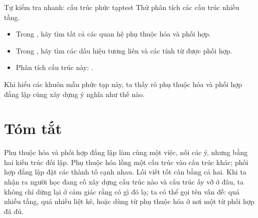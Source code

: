 \begin{tblsframedsymbol}{Tự kiểm tra nhanh: cấu trúc phức tạp}{test}
Thử phân tích các cấu trúc nhiều tầng.
\begin{itemize}[noitemsep, leftmargin=*]
    \item Trong , hãy tìm tất cả các quan hệ phụ thuộc hóa và phối hợp.
    \item Trong , hãy tìm các dấu hiệu tương liên và các tính từ được phối hợp.
    \item Phân tích cấu trúc này: .
\end{itemize}
Khi hiểu các khuôn mẫu phức tạp này, ta thấy rõ phụ thuộc hóa và phối hợp đẳng lập cùng xây dựng ý nghĩa như thế nào.
\end{tblsframedsymbol}

\section{Tóm tắt}

Phụ thuộc hóa và phối hợp đẳng lập làm cùng một việc, nối các ý, nhưng bằng hai kiến trúc đối lập. Phụ thuộc hóa lồng một cấu trúc vào cấu trúc khác; phối hợp đẳng lập đặt các thành tố cạnh nhau. Lối viết tốt cân bằng cả hai. Khi ta nhận ra người học đang cố xây dựng cấu trúc nào và cấu trúc ấy vỡ ở đâu, ta không chỉ dừng lại ở cảm giác rằng có gì đó lạ; ta có thể gọi tên vấn đề: quá nhiều tầng, quá nhiều liệt kê, hoặc dùng từ phụ thuộc hóa ở nơi một từ phối hợp đã đủ.
